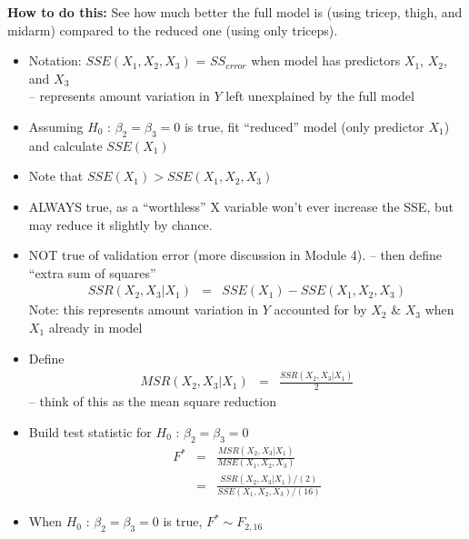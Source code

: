 \documentclass[12pt]{notes}
\begin{document}
\textbf{How to do this:} See how much better the full model is (using tricep, thigh, and midarm) compared to the reduced one (using only triceps). 
\begin{itemize}
  \item Notation: $SSE(X_1,X_2,X_3)$ = $SS_{error}$ when model has
  predictors $X_1$, $X_2$, and $X_3$\\
  -- represents amount variation in $Y$ left unexplained by the full model
  \item Assuming $H_0$ : $\beta_2=\beta_3=0$ is true, fit
  ``reduced'' model (only predictor $X_1$) and calculate
  $SSE(X_1)$
  \item Note that $SSE(X_1) > 
  SSE(X_1,X_2,X_3)$\\
\bi
\item ALWAYS true, as a ``worthless'' X variable won't ever increase the SSE, but may reduce it slightly by chance. 
\item NOT true of validation error (more discussion in Module 4). 
\ei
  -- then define ``extra sum of squares''
  \begin{eqnarray}
    SSR(X_2,X_3 | X_1) & = & SSE(X_1) - SSE(X_1,X_2,X_3) \nonumber
  \end{eqnarray}
  Note: this represents amount variation in $Y$ accounted for by
  $X_2$ \& $X_3$ when $X_1$ already in model
  \item Define
  \begin{eqnarray}
    MSR(X_2,X_3 | X_1) & = & \frac{SSR(X_2,X_3|X_1)}{2} \nonumber
  \end{eqnarray}
  -- think of this as the mean square reduction\\ \vspace{2em}
  \item Build test statistic for $H_0$ : $\beta_2=\beta_3=0$
  \begin{eqnarray}
     F^* & = & \frac{MSR(X_2,X_3 | X_1)}{MSE(X_1,X_2,X_3)} \nonumber    \\
         & = & \frac{SSR(X_2,X_3|X_1) / (2)}{SSE(X_1,X_2,X_3) / (16)} \nonumber
  \end{eqnarray}

  \item When $H_0$ : $\beta_2=\beta_3=0$  is true, $F^* \sim
  F_{2,16}$
\end{itemize}
\end{document}
